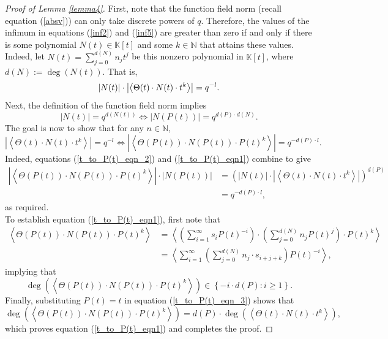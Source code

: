 \documentclass{article}
\theoremstyle{definition}
\newcommand{\N}{\mathbb{N}}
\newcommand{\K}{\mathbb{K}}
\numberwithin{equation}{subsection}
\begin{document}
 \begin{proof}[Proof of Lemma \ref{lemma4}]
 First, note that the function field norm (recall equation (\ref{absv})) can only take discrete powers of $q$. Therefore, the values of the infimum in equations (\ref{inf2}) and (\ref{inf5}) are greater than zero if and only if there is some polynomial $N(t)\in\K[t]$ and some $k\in\N$ that attains these values. Indeed, let $N(t)=\sum^{d(N)}_{j=0}n_jt^j$ be this nonzero polynomial in $\K[t]$, where $d(N):=\deg(N(t))$. That is,\vspace{-0.3cm}\begin{equation}|N(t)|\cdot \left|\left\langle\Theta(t)\cdot N(t) \cdot t^k\right\rangle\right|=q^{-l}.\vspace{-0.3cm}\nonumber\end{equation} \vspace{-0.3cm}\noindent Next, the definition of the function field norm implies \begin{equation}\label{t_to_P(t)_eqn_2}
     |N(t)|=q^{d(N(t))} \Leftrightarrow |N(P(t))|=q^{d(P)\cdot d(N)}.
 \end{equation}The goal is now to show that for any $n\in\N$, \begin{equation}
       \left|\left\langle\Theta(t)\cdot N(t) \cdot t^k\right\rangle\right|=q^{-l}\Leftrightarrow\left|\left\langle\Theta(P(t))\cdot N(P(t)) \cdot P(t)^k\right\rangle\right|=q^{-d(P)\cdot l}.\label{t_to_P(t)_eqn1}
 \end{equation}Indeed, equations (\ref{t_to_P(t)_eqn_2}) and (\ref{t_to_P(t)_eqn1}) combine to give \begin{align*}\left|\left\langle\Theta(P(t))\cdot N(P(t)) \cdot P(t)^k\right\rangle\right|\cdot |N(P(t))| &= \left(|N(t)|\cdot\left|\left\langle\Theta(t)\cdot N(t) \cdot t^k\right\rangle\right|\right)^{d(P)}\\&=q^{-d(P)\cdot l}, \end{align*} as required. \\
 
 \noindent To establish equation (\ref{t_to_P(t)_eqn1}), first note that \begin{align}
     \left\langle\Theta(P(t))\cdot N(P(t)) \cdot P(t)^k\right\rangle &= \left\langle\left(\sum^\infty_{i=1}s_iP(t)^{-i}\right)\cdot \left(\sum^{d(N)}_{j=0}n_jP(t)^j\right) \cdot P(t)^k\right\rangle\nonumber\\
     &=\left\langle\sum^\infty_{i=1}\left(\sum^{d(N)}_{j=0}n_j\cdot s_{i+j+k}\right)P(t)^{-i}\right\rangle,\label{t_to_P(t)_eqn_3}
 \end{align} implying that \begin{equation}
     \label{crucial} \deg\left(\left\langle\Theta(P(t))\cdot N(P(t)) \cdot P(t)^k\right\rangle\right)\in\left\{-i\cdot d(P): i\ge1\right\}.
 \end{equation}
 \noindent Finally, substituting $P(t)=t$ in equation (\ref{t_to_P(t)_eqn_3}) shows that $$\deg(\left\langle\Theta(P(t))\cdot N(P(t)) \cdot P(t)^k\right\rangle)=d(P)\cdot \deg(\left\langle\Theta(t)\cdot N(t) \cdot t^k\right\rangle),$$ which proves equation (\ref{t_to_P(t)_eqn1}) and completes the proof.
 \end{proof}
\end{document}
